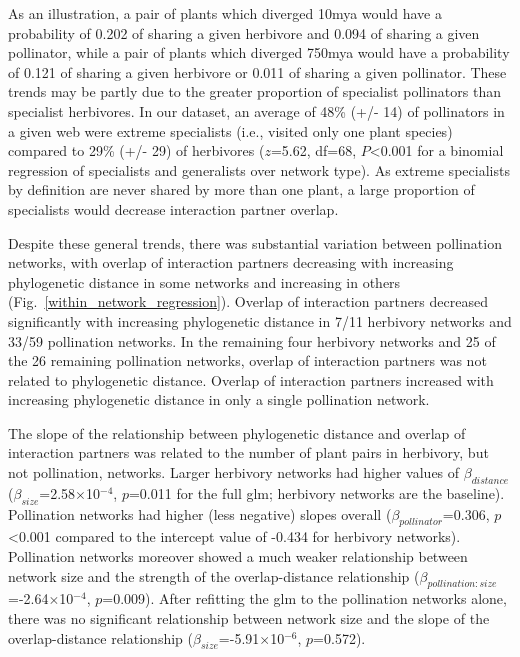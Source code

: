 \documentclass[12pt]{article}
\begin{document}
\begin{spacing}{1.5}
    As an illustration, a pair
    of plants which diverged 10mya would have a probability of 0.202 of sharing
    a given herbivore and 0.094 of sharing a given pollinator, while a 
    pair of plants which diverged 750mya would 
    have a probability of 0.121 of sharing a given herbivore or 
    0.011 of sharing a given pollinator.
    These trends may be partly 
    due to the greater proportion of specialist pollinators than specialist 
    herbivores. In our dataset, an average of 48\% (+/- 14) of pollinators 
    in a given web were extreme specialists (i.e., visited only one plant 
    species) compared to 29\% (+/- 29) of herbivores ($z$=5.62, df=68, 
    $P$\textless0.001 for a binomial regression of specialists and 
    generalists over network type). As extreme specialists by definition 
    are never shared by more than one plant, a large proportion of specialists
    would decrease interaction partner overlap.


    Despite these general trends, there was substantial variation between 
    pollination networks, with overlap of interaction partners decreasing 
    with increasing phylogenetic distance in some networks and increasing 
    in others (Fig.~\ref{within_network_regression}). Overlap of 
    interaction partners decreased significantly with increasing 
    phylogenetic distance in 7/11 herbivory networks and 33/59 
    pollination networks. In the remaining four herbivory networks and 
    25 of the 26 remaining pollination networks, overlap of interaction 
    partners was not related to phylogenetic distance. Overlap of 
    interaction partners increased with increasing phylogenetic distance 
    in only a single pollination network.%


    The slope of the relationship between phylogenetic distance and 
    overlap of interaction partners was related to the number of plant pairs 
    in herbivory, but not pollination, networks. Larger herbivory networks 
    had higher values of $\beta_{distance}$ 
    ($\beta_{size}$=2.58$\times$10$^{-4}$, $p$=0.011 for the full glm; 
    herbivory networks are the baseline). Pollination networks had 
    higher (less negative) slopes overall ($\beta_{pollinator}$=0.306, 
    $p$\textless0.001 compared to the intercept value of -0.434 for 
    herbivory networks). Pollination networks moreover showed a 
    much weaker relationship between network size and the strength of the 
    overlap-distance relationship 
    ($\beta_{pollination:size}$=-2.64$\times$10$^{-4}$, $p$=0.009). 
    After refitting the glm to the pollination networks alone, there was 
    no significant relationship between network size and the slope of 
    the overlap-distance relationship ($\beta_{size}$=-5.91$\times$10$^{-6}$, 
    $p$=0.572).



\end{spacing}
\end{document}
